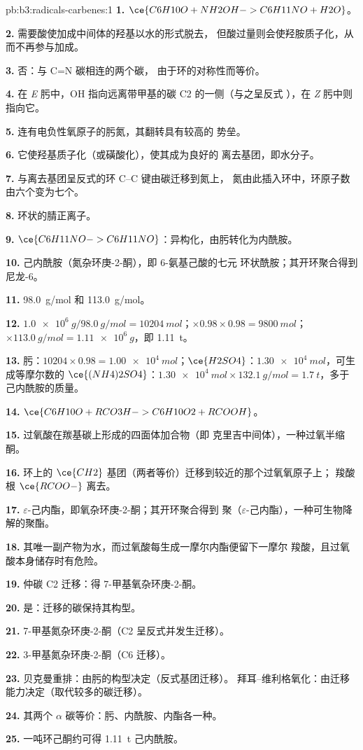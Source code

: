 \begin{solution}{pb:b3:radicals-carbenes:1}
\textbf{1.} $\ce{C6H10O + NH2OH -> C6H11NO + H2O}$。

\textbf{2.} 需要酸使加成中间体的羟基以水的形式脱去，
但酸过量则会使羟胺质子化，从而不再参与加成。

\textbf{3.} 否：与 C=N 碳相连的两个碳，
由于环的对称性而等价。

\textbf{4.} 在 \textit{E} 肟中，OH 指向远离带甲基的碳 C2 的一侧（与之呈反式
），在 \textit{Z} 肟中则指向它。

\textbf{5.} 连有电负性氧原子的肟氮，其翻转具有较高的
势垒。

\textbf{6.} 它使羟基质子化（或磺酸化），使其成为良好的
离去基团，即水分子。

\textbf{7.} 与离去基团呈反式的环 C--C 键由碳迁移到氮上，
氮由此插入环中，环原子数由六个变为七个。

\textbf{8.} 环状的腈正离子。

\textbf{9.} $\ce{C6H11NO -> C6H11NO}$：异构化，由肟转化为内酰胺。

\textbf{10.} 己内酰胺（氮杂环庚-2-酮），即 6-氨基己酸的七元
环状酰胺；其开环聚合得到尼龙-6。

\textbf{11.} \qty{98.0}{g/mol} 和 \qty{113.0}{g/mol}。

\textbf{12.} $\qty{1.0e6}{g}/\qty{98.0}{g/mol} = \qty{10204}{mol}$；$\times 0.98 \times 0.98 = \qty{9800}{mol}$；$\times \qty{113.0}{g/mol} = \qty{1.11e6}{g}$，即 \qty{1.11}{t}。

\textbf{13.} 肟：$\num{10204} \times 0.98 = \qty{1.00e4}{mol}$；$\ce{H2SO4}$：$\qty{1.30e4}{mol}$，可生成等摩尔数的
$\ce{(NH4)2SO4}$：$\qty{1.30e4}{mol} \times \qty{132.1}{g/mol} = \qty{1.7}{t}$，多于己内酰胺的质量。

\textbf{14.} $\ce{C6H10O + RCO3H -> C6H10O2 + RCOOH}$。

\textbf{15.} 过氧酸在羰基碳上形成的四面体加合物（即
克里吉中间体），一种过氧半缩酮。

\textbf{16.} 环上的 $\ce{CH2}$ 基团（两者等价）迁移到较近的那个过氧氧原子上；
羧酸根 $\ce{RCOO-}$ 离去。

\textbf{17.} $\varepsilon$-己内酯，即氧杂环庚-2-酮；其开环聚合得到
聚（$\varepsilon$-己内酯），一种可生物降解的聚酯。

\textbf{18.} 其唯一副产物为水，而过氧酸每生成一摩尔内酯便留下一摩尔
羧酸，且过氧酸本身储存时有危险。

\textbf{19.} 仲碳 C2 迁移：得 7-甲基氧杂环庚-2-酮。

\textbf{20.} 是：迁移的碳保持其构型。

\textbf{21.} 7-甲基氮杂环庚-2-酮（C2 呈反式并发生迁移）。

\textbf{22.} 3-甲基氮杂环庚-2-酮（C6 迁移）。

\textbf{23.} 贝克曼重排：由肟的构型决定（反式基团迁移）。
拜耳–维利格氧化：由迁移能力决定（取代较多的碳迁移）。

\textbf{24.} 其两个 $\alpha$ 碳等价：肟、内酰胺、内酯各一种。

\textbf{25.} 一吨环己酮约可得 \qty{1.11}{t} 己内酰胺。
\end{solution}
